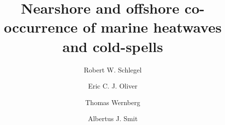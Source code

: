 \documentclass[a4paper,10pt,review]{elsarticle}
\begin{document}
\begin{frontmatter}

\title{Nearshore and offshore co-occurrence of marine heatwaves and cold-spells}

\author[firstaddress]{Robert W. Schlegel}
\author[secondaddress,thirdaddress]{Eric C. J. Oliver}
\author[fourthaddress]{Thomas Wernberg}
\author[firstaddress]{Albertus J. Smit}



\address[firstaddress]{Department of Biodiversity and Conservation Biology, University of the Western Cape, Private Bag X17, Bellville 7535, South Africa}

\address[secondaddress]{ARC Centre of Excellence for Climate System Science, Australia}

\address[thirdaddress]{Institute for Marine and Antarctic Studies, University of Tasmania, Hobart, Australia}

\address[fourthaddress]{UWA Oceans Institute and School of Plant Biology, The University of Western Australia, Crawley, 6009 Western Australia, Australia}


\end{frontmatter}
\end{document}
